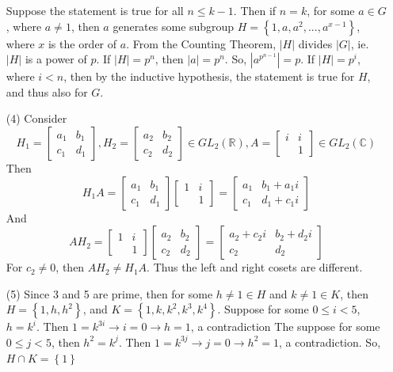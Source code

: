 \begin{itemize}
Suppose the statement is true for all $n \leq k - 1$. Then if $n = k$, for some $a \in G$, where $a \neq 1$, then $a$ generates some subgroup $H = \left\lbrace 1, a, a^2, ..., a^{x - 1} \right\rbrace$, where $x$ is the order of $a$. From the Counting Theorem, $|H|$ divides $|G|$, ie. $|H|$ is a power of $p$. If $|H| = p^n$, then $|a| = p^n$. So, $|a^{p^{n-1}}| = p$. If $|H| = p^i$, where $i < n$, then by the inductive hypothesis, the statement is true for $H$, and thus also for $G$.
\item[(4)]
Consider
$$H_1 = \begin{bmatrix}
a_1 & b_1 \\
c_1 & d_1
\end{bmatrix}, H_2 = \begin{bmatrix}
a_2 & b_2 \\
c_2 & d_2
\end{bmatrix} \in GL_2(\mathbb{R}), A = \begin{bmatrix}
i & i \\
& 1
\end{bmatrix} \in GL_2(\mathbb{C})$$
Then
$$H_1A = \begin{bmatrix}
a_1 & b_1 \\
c_1 & d_1
\end{bmatrix}\begin{bmatrix}
1 & i \\
& 1
\end{bmatrix} = \begin{bmatrix}
a_1 & b_1 + a_1i \\
c_1 & d_1 + c_1i
\end{bmatrix}$$
And
$$AH_2 = \begin{bmatrix}
1 & i \\
& 1
\end{bmatrix}\begin{bmatrix}
a_2 & b_2 \\
c_2 & d_2
\end{bmatrix} = \begin{bmatrix}
a_2 + c_2i & b_2 + d_2i \\
c_2 & d_2
\end{bmatrix}$$
For $c_2 \neq 0$, then $AH_2 \neq H_1A$. Thus the left and right cosets are different.
\item[(5)]
Since 3 and 5 are prime, then for some $h \neq 1 \in H$ and $k \neq 1 \in K$, then $H = \left\lbrace 1, h, h^2 \right\rbrace$, and $K = \left\lbrace 1, k, k^2, k^3, k^4 \right\rbrace$. Suppose for some $0 \leq i < 5$, $h = k^i$. Then $1 = k^{3i} \rightarrow i = 0 \rightarrow h = 1$, a contradiction The suppose for some $0 \leq j < 5$, then $h^2 = k^j$. Then $1 = k^{3j} \rightarrow j = 0 \rightarrow h^2 = 1$, a contradiction. So, $H \cap K = \left\lbrace 1 \right\rbrace$

\end{itemize}
